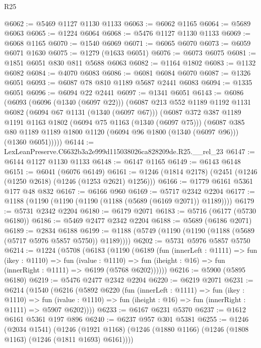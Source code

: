 \begin{lexlean}{R25}
\begin{coremodule}
@6062 := @5469 @1127 @1130 @1133
@6063 := @6062 @1165
@6064 := @5689 @6063
@6065 := @1224 @6064
@6068 := @5476 @1127 @1130 @1133
@6069 := @6068 @1165
@6070 := @1540 @6069
@6071 := @6065 @6070
@6073 := @6059 @6071 @1630
@6075 := @1279 (@1633 @6051)
@6076 := @6073 @6075
@6081 := @1851 @6051 @830 @811 @5688 @6063
@6082 := @1164 @1802
@6083 := @1132 @6082
@6084 := @4070 @6083
@6086 := @6081 @6084 @6070
@6087 := @1326 @6051
@6093 := @6087 @78 @810 @1189 @5687 @2441 @6083
@6094 := @1335 @6051
@6096 := @6094 @22 @2441
@6097 := @1341 @6051
@6143 := @6086
    (@6093
      (@6096 (@1340 (@6097 @22)))
      (@6087
        @213
        @552
        @1189
        @1192
        @1131
        @6082
        (@6094 @67 @1131 (@1340 (@6097 @67)))
        (@6087
          @372
          @387
          @1189
          @1191
          @1163
          @1802
          (@6094 @75 @1163 (@1340 (@6097 @75)))
          (@6087
            @385
            @80
            @1189
            @1189
            @1800
            @1120
            (@6094 @96 @1800 (@1340 (@6097 @96)))
            (@1360 @6051)))))
@6144 := LexLeanPreserve.C6632b3a2e999d115038026ca828209de.R25.__rel_23
@6147 := @6144 @1127 @1130 @1133
@6148 := @6147 @1165
@6149 := @6143 @6148
@6151 := @6041 (@6076 @6149)
@6161 := @1246 (@1814 @2178) (@2451 (@1246 (@1250 @2618) (@1246 (@1253 @2621) @1256)))
@6166 := @1779 @6161 @5361 @177 @48 @832
@6167 := @6166 @960
@6169 := @5717 @2342 @2204
@6177 := @1188 (@1190 (@1190 (@1190 (@1188 (@5689 (@6169 @2071)) @1189))))
@6179 := @5731 @2342 @2204
@6180 := @6179 @2071
@6183 := @5716 (@6177 (@5730 @6180))
@6186 := @5469 @2477 @2342 @2204
@6188 := @5689 (@6186 @2071)
@6189 := @2834 @6188
@6199 := @1188 (@5749 (@1190 (@1190 (@1188 (@5689 (@5717 @5976 @5857 @5750)) @1189))))
@6202 := @5731 @5976 @5857 @5750
@6214 := @1224
    (@5708
      (@6183
        (@1190
          (@6189
            (fun (innerLeft : @1111) =>
            fun (ikey : @1110) =>
            fun (ivalue : @1110) =>
            fun (iheight : @16) => fun (innerRight : @1111) => @6199 (@5768 @6202))))))
@6216 := @5900 (@5895 @6180)
@6219 := @5476 @2477 @2342 @2204
@6220 := @6219 @2071
@6231 := @6214
    (@1540
      (@6216
        (@5892
          @6220
          (fun (innerLeft : @1111) =>
          fun (ikey : @1110) =>
          fun (ivalue : @1110) => fun (iheight : @16) => fun (innerRight : @1111) => @5907 @6202))))
@6233 := @6167 @6231 @5370
@6237 := @1612 @6161 @5361 @197 @896
@6240 := @6237 @957 @301 @5381
@6255 := @1246
    (@2034 @1541)
    (@1246 (@1921 @1168) (@1246 (@1880 @1166) (@1246 (@1808 @1163) (@1246 (@1811 @1693) @6161))))

\end{coremodule}
\end{lexlean}
